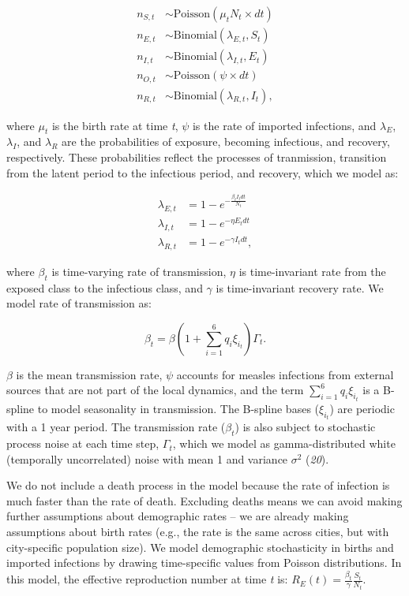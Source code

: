 \documentclass[3p]{elsarticle} %
\begin{document}
\begin{align}
n_{S,t} &\sim \text{Poisson}(\mu_t N_t \times dt) \\
n_{E,t} &\sim \text{Binomial}(\lambda_{E,t}, S_{t}) \\
n_{I,t} &\sim \text{Binomial}(\lambda_{I,t}, E_{t}) \\
n_{O,t} &\sim \text{Poisson}(\psi \times dt) \\
n_{R,t} &\sim \text{Binomial}(\lambda_{R,t}, I_{t}),
\end{align}

\noindent{}where \(\mu_t\) is the birth rate at time \emph{t}, \(\psi\)
is the rate of imported infections, and \(\lambda_E\), \(\lambda_I\),
and \(\lambda_R\) are the probabilities of exposure, becoming
infectious, and recovery, respectively. These probabilities reflect the
processes of tranmission, transition from the latent period to the
infectious period, and recovery, which we model as:

\begin{align}
\lambda_{E,t} &= 1 - e^{-\frac{\beta_t I_t dt}{N_t}} \\
\lambda_{I,t} &= 1 - e^{-\eta E_{t} dt} \\
\lambda_{R,t} &= 1 - e^{-\gamma I_{t} dt},
\end{align}

\noindent{}where \(\beta_t\) is time-varying rate of transmission,
\(\eta\) is time-invariant rate from the exposed class to the infectious
class, and \(\gamma\) is time-invariant recovery rate. We model rate of
transmission as:

\begin{equation}
\beta_t = \beta \left(1 + \sum^6_{i=1} q_i \xi_{i_{t}} \right) \Gamma_t.
\end{equation}

\(\beta\) is the mean transmission rate, \(\psi\) accounts for measles
infections from external sources that are not part of the local
dynamics, and the term \(\sum^6_{i=1} q_i \xi_{i_{t}}\) is a B-spline to
model seasonality in transmission. The B-spline bases (\(\xi_{i_{t}}\))
are periodic with a 1 year period. The transmission rate (\(\beta_t\))
is also subject to stochastic process noise at each time step,
\(\Gamma_t\), which we model as gamma-distributed white (temporally
uncorrelated) noise with mean 1 and variance \(\sigma^2\) (\emph{20}).

We do not include a death process in the model because the rate of
infection is much faster than the rate of death. Excluding deaths means
we can avoid making further assumptions about demographic rates -- we
are already making assumptions about birth rates (e.g., the rate is the
same across cities, but with city-specific population size). We model
demographic stochasticity in births and imported infections by drawing
time-specific values from Poisson distributions. In this model, the
effective reproduction number at time \emph{t} is:
\(R_E(t) = \frac{\beta_t}{\gamma} \frac{S_t}{N_t}\).
\end{document}
